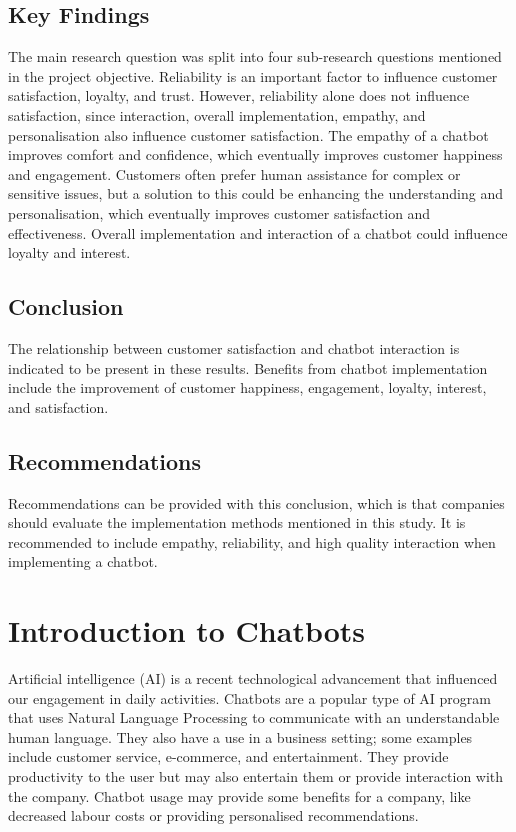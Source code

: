 \documentclass[a4paper]{article}
\begin{document}
\subsection{Key Findings}
The main research question was split into four sub-research questions mentioned in the project objective. Reliability is an important factor to influence customer satisfaction, loyalty, and trust. However, reliability alone does not influence satisfaction, since interaction, overall implementation, empathy, and personalisation also influence customer satisfaction. The empathy of a chatbot improves comfort and confidence, which eventually improves customer happiness and engagement. Customers often prefer human assistance for complex or sensitive issues, but a solution to this could be enhancing the understanding and personalisation, which eventually improves customer satisfaction and effectiveness. Overall implementation and interaction of a chatbot could influence loyalty and interest.

\subsection{Conclusion}
The relationship between customer satisfaction and chatbot interaction is indicated to be present in these results. Benefits from chatbot implementation include the improvement of customer happiness, engagement, loyalty, interest, and satisfaction.

\subsection{Recommendations}
Recommendations can be provided with this conclusion, which is that companies should evaluate the implementation methods mentioned in this study. It is recommended to include empathy, reliability, and high quality interaction when implementing a chatbot.

\section{Introduction to Chatbots}

Artificial intelligence (AI) is a recent technological advancement that influenced our engagement in daily activities. Chatbots are a popular type of AI program that uses Natural Language Processing to communicate with an understandable human language. They also have a use in a business setting; some examples include customer service, e-commerce, and entertainment. They provide productivity to the user but may also entertain them or provide interaction with the company. Chatbot usage may provide some benefits for a company, like decreased labour costs or providing personalised recommendations.
\end{document}
